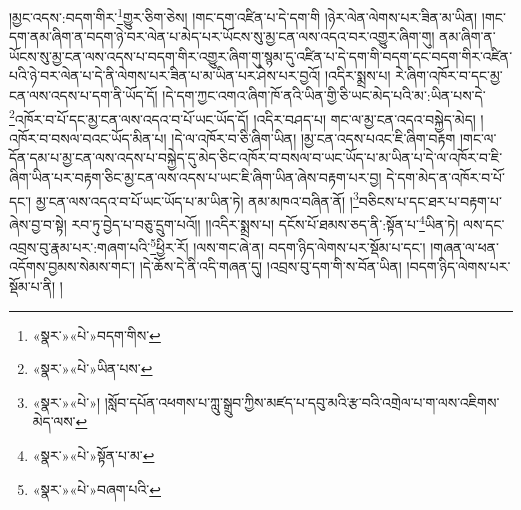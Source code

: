 །མྱང་འདས་:བདག་གིར་\footnote{«སྣར་»«པེ་»བདག་གིས་}གྱུར་ཅིག་ཅེས། །གང་དག་འཛིན་པ་དེ་དག་གི །ཉེར་ལེན་ལེགས་པར་ཟིན་མ་ཡིན། །གང་དག་ནམ་ཞིག་ན་བདག་ཉེ་བར་ལེན་པ་མེད་པར་ཡོངས་སུ་མྱ་ངན་ལས་འདའ་བར་འགྱུར་ཞིག་གུ། ནམ་ཞིག་ན་ཡོངས་སུ་མྱ་ངན་ལས་འདས་པ་བདག་གིར་འགྱུར་ཞིག་གུ་སྙམ་དུ་འཛིན་པ་དེ་དག་གི་བདག་དང་བདག་གིར་འཛིན་པའི་ཉེ་བར་ལེན་པ་དེ་ནི་ལེགས་པར་ཟིན་པ་མ་ཡིན་པར་ཤེས་པར་བྱའོ། །འདིར་སྨྲས་པ། རེ་ཞིག་འཁོར་བ་དང་མྱ་ངན་ལས་འདས་པ་དག་ནི་ཡོད་དོ། །དེ་དག་ཀྱང་འགའ་ཞིག་ཁོ་ནའི་ཡིན་གྱི་ཅི་ཡང་མེད་པའི་མ་:ཡིན་པས་དེ་\footnote{«སྣར་»«པེ་»ཡིན་པས་}འཁོར་བ་པོ་དང་མྱ་ངན་ལས་འདའ་བ་པོ་ཡང་ཡོད་དོ། །འདིར་བཤད་པ། གང་ལ་མྱ་ངན་འདའ་བསྐྱེད་མེད། །འཁོར་བ་བསལ་བའང་ཡོད་མིན་པ། །དེ་ལ་འཁོར་བ་ཅི་ཞིག་ཡིན། །མྱ་ངན་འདས་པའང་ཇི་ཞིག་བརྟག །གང་ལ་དོན་དམ་པ་མྱ་ངན་ལས་འདས་པ་བསྐྱེད་དུ་མེད་ཅིང་འཁོར་བ་བསལ་བ་ཡང་ཡོད་པ་མ་ཡིན་པ་དེ་ལ་འཁོར་བ་ཇི་ཞིག་ཡིན་པར་བརྟག་ཅིང་མྱ་ངན་ལས་འདས་པ་ཡང་ཇི་ཞིག་ཡིན་ཞེས་བརྟག་པར་བྱ། དེ་དག་མེད་ན་འཁོར་བ་པོ་དང་། མྱ་ངན་ལས་འདའ་བ་པོ་ཡང་ཡོད་པ་མ་ཡིན་ཏེ། ནམ་མཁའ་བཞིན་ནོ། །\footnote{«སྣར་»«པེ་»། །སློབ་དཔོན་འཕགས་པ་ཀླུ་སྒྲུབ་ཀྱིས་མཛད་པ་དབུ་མའི་རྩ་བའི་འགྲེལ་པ་ག་ལས་འཇིགས་མེད་ལས་}བཅིངས་པ་དང་ཐར་པ་བརྟག་པ་ཞེས་བྱ་བ་སྟེ། རབ་ཏུ་བྱེད་པ་བཅུ་དྲུག་པའོ།། །།འདིར་སྨྲས་པ། དངོས་པོ་ཐམས་ཅད་ནི་:སྟོན་པ་\footnote{«སྣར་»«པེ་»སྟོན་པ་མ་}ཡིན་ཏེ། ལས་དང་འབྲས་བུ་རྣམ་པར་:གཞག་པའི་\footnote{«སྣར་»«པེ་»བཞག་པའི་}ཕྱིར་རོ། །ལས་གང་ཞེ་ན། བདག་ཉིད་ལེགས་པར་སྡོམ་པ་དང་། །གཞན་ལ་ཕན་འདོགས་བྱམས་སེམས་གང་། །དེ་ཆོས་དེ་ནི་འདི་གཞན་དུ། །འབྲས་བུ་དག་གི་ས་བོན་ཡིན། །བདག་ཉིད་ལེགས་པར་སྡོམ་པ་ནི། །
